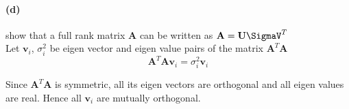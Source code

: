 \documentclass[12pt, letterpaper]{article}
\begin{document}
\paragraph{(d)} show that a full rank matrix $\mathbf{A}$ can be written as $\mathbf{A} = \mathbf{U\SigmaV}^T$\\

Let $\mathbf{v}_i$, $\sigma^2_i$ be eigen vector and eigen value pairs of the matrix $\mathbf{A}^T\mathbf{A}$
\begin{equation}
\label{eq:3}
  \mathbf{A}^T\mathbf{Av}_i = \sigma_i^2\mathbf{v}_i
\end{equation}

Since $\mathbf{A}^T\mathbf{A}$ is symmetric, all its eigen vectors are orthogonal and all eigen values are real. Hence all $\mathbf{v}_i$ are mutually orthogonal.\\
\end{document}
